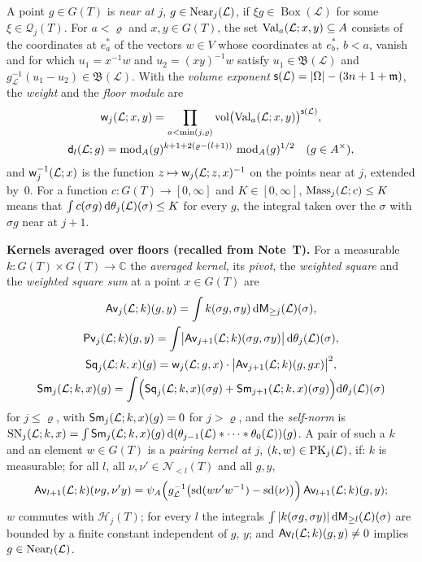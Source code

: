 \documentclass[11pt,a4paper]{article}
\newcommand{\m}[1]{\mbox{$#1$}}        %
\newcommand{\subhead}[1]{\par\addvspace{9pt plus 2pt}\Needspace{4\baselineskip}\noindent\textbf{#1}\enspace\ignorespaces}
\theoremstyle{plainx}
\theoremstyle{uprightx}
\newcommand{\cL}{\mathcal{L}}
\newcommand{\CC}{\mathbb{C}}
\newcommand{\dd}{\mathrm{d}}
\newcommand{\GT}[1]{G(#1)}
\newcommand{\Hl}[2]{\mathcal{H}_{#1}(#2)}
\newcommand{\Ql}[2]{\mathcal{Q}_{#1}(#2)}
\newcommand{\Nb}[2]{\mathcal{N}_{<#1}(#2)}
\newcommand{\modA}{\operatorname{mod}_A}
\newcommand{\sd}{\operatorname{sd}}
\newcommand{\gL}[1]{g_{#1}}
\newcommand{\BoxL}[1]{\operatorname{Box}(#1)}
\newcommand{\Ball}[1]{\mathfrak{B}(#1)}
\newcommand{\vol}{\operatorname{vol}}
\begin{document}
A point $g\in\GT{T}$ is \emph{near at $j$}, \m{\IsNear{\cL}{j}{g}}, if $\xi g\in\BoxL{\cL}$ for some
$\xi\in\Ql{j}{T}$. For $a<\varrho$ and $x,y\in\GT{T}$, the set $\floorValues{\cL}{a}{x}{y}\subseteq A$ consists of the
coordinates at $e^*_a$ of the vectors $w\in V$ whose coordinates at $e^*_b$, $b<a$, vanish and for which
$u_1=x^{-1}w$ and $u_2=(xy)^{-1}w$ satisfy $u_1\in\Ball{\cL}$ and $\gL{\cL}^{-1}(u_1-u_2)\in\Ball{\cL}$. With the
\emph{volume exponent} $\volumeExponent{\cL}=|\Omega|-(3n+1+\mathfrak{m})$, the \emph{weight} and the \emph{floor
module} are
\[\begin{gathered}
\floorWeight{\cL}{j}{x}{y}=\prod_{a<\min(j,\varrho)}\vol\bigl(\floorValues{\cL}{a}{x}{y}\bigr)^{\volumeExponent{\cL}},\\
\floorModulus{\cL}{l}{g}=\modA(g)^{k+1+2(\varrho-(l+1))}\,\modA(g)^{1/2}\quad(g\in A^{\times}),
\end{gathered}\]
and $\invWeight{\cL}{j}{x}$ is the function $z\mapsto\floorWeight{\cL}{j}{z}{x}^{-1}$ on the points near at $j$,
extended by~$0$. For a function $c\colon\GT{T}\to[0,\infty]$ and $K\in[0,\infty]$, \m{\FloorMassLe{\cL}{j}{K}{c}}
means that $\int c(\sigma g)\,\dd\floorMeasure{\cL}{j}(\sigma)\le K$ for every $g$, the integral taken over the
$\sigma$ with $\sigma g$ near at $j+1$.

\subhead{Kernels averaged over floors (recalled from Note~T).} For a measurable
$k\colon\GT{T}\times\GT{T}\to\CC$ the \emph{averaged kernel}, its \emph{pivot}, the \emph{weighted square} and the
\emph{weighted square sum} at a point $x\in\GT{T}$ are
\begin{gather*}
\upperPairing{\cL}{j}{k}{g}{y}=\int k(\sigma g,\sigma y)\,\dd\upperMeasure{\cL}{j}(\sigma),\\
\pivotModulus{\cL}{j}{k}{g}{y}=\int\bigl|\upperPairing{\cL}{j+1}{k}{\sigma g}{\sigma y}\bigr|\,\dd\floorMeasure{\cL}{j}(\sigma),\\
\weightedSquare{\cL}{j}{k}{x}{g}=\floorWeight{\cL}{j}{g}{x}\cdot\bigl|\upperPairing{\cL}{j+1}{k}{g}{gx}\bigr|^{2},\\
\weightedSquareSum{\cL}{k}{x}{j}{g}=\int\Bigl(\weightedSquare{\cL}{j}{k}{x}{\sigma g}+\weightedSquareSum{\cL}{k}{x}{j+1}{\sigma g}\Bigr)\dd\floorMeasure{\cL}{j}(\sigma)
\end{gather*}
for $j\le\varrho$, with $\weightedSquareSum{\cL}{k}{x}{j}{g}=0$ for $j>\varrho$,
and the \emph{self-norm} is
$\selfNorm{\cL}{j}{k}{x}=\int\weightedSquareSum{\cL}{k}{x}{j}{g}\,\dd(\floorMeasure{\cL}{j-1}*\dots*\floorMeasure{\cL}{0})(g)$.
A pair of such a $k$ and an element $w\in\GT{T}$ is a \emph{pairing kernel at $j$}, \m{\IsPairingKernel{\cL}{j}{k}{w}},
if: $k$ is measurable; for all $l$, all $\nu,\nu'\in\Nb{l}{T}$ and all $g,y$,
\[\upperPairing{\cL}{l+1}{k}{\nu g}{\nu'y}=\psi_A\Bigl(\gL{\cL}^{-1}\bigl(\sd(w\nu'w^{-1})-\sd(\nu)\bigr)\Bigr)\,\upperPairing{\cL}{l+1}{k}{g}{y};\]
$w$ commutes with $\Hl{j}{T}$; for every $l$ the integrals $\int|k(\sigma g,\sigma y)|\,\dd\upperMeasure{\cL}{l}(\sigma)$
are bounded by a finite constant independent of $g$, $y$; and $\upperPairing{\cL}{l}{k}{g}{y}\ne0$ implies
\m{\IsNear{\cL}{l}{g}}.
\end{document}
